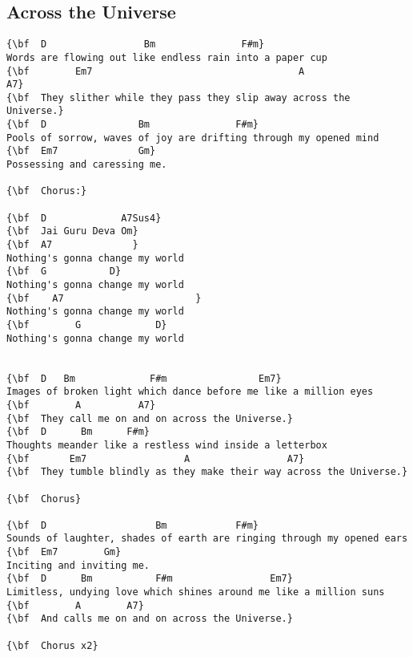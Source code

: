 \documentclass[a4paper]{article}
\begin{document}
\subsection{Across the Universe}
\begin{Verbatim}[commandchars=\\\{\}]
{\bf  D                 Bm               F#m}
Words are flowing out like endless rain into a paper cup
{\bf        Em7                                    A                  A7}
{\bf  They slither while they pass they slip away across the Universe.}
{\bf  D                Bm               F#m}
Pools of sorrow, waves of joy are drifting through my opened mind
{\bf  Em7              Gm}
Possessing and caressing me.

{\bf  Chorus:}

{\bf  D             A7Sus4}
{\bf  Jai Guru Deva Om}
{\bf  A7			  }
Nothing's gonna change my world
{\bf  G			  D}
Nothing's gonna change my world
{\bf    A7			             }
Nothing's gonna change my world
{\bf        G			  D}
Nothing's gonna change my world


{\bf  D	  Bm		     F#m	   		    Em7}
Images of broken light which dance before me like a million eyes
{\bf        A		   A7}
{\bf  They call me on and on across the Universe.}
{\bf  D		 Bm		 F#m}
Thoughts meander like a restless wind inside a letterbox
{\bf       Em7			       A                 A7}
{\bf  They tumble blindly as they make their way across the Universe.}

{\bf  Chorus}

{\bf  D                   Bm			F#m}
Sounds of laughter, shades of earth are ringing through my opened ears
{\bf  Em7	     Gm}
Inciting and inviting me.
{\bf  D	     Bm		      F#m			      Em7}
Limitless, undying love which shines around me like a million suns
{\bf        A	     A7}
{\bf  And calls me on and on across the Universe.}

{\bf  Chorus x2}


\end{Verbatim}
\newpage
\end{document}
